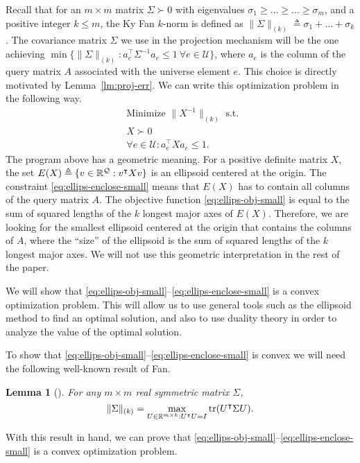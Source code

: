 \documentclass{article}
\newtheorem{lemma}{Lemma}[theorem]
\def\tr{{\rm tr}} \def\rank{{\rm rank}}
\newcommand{\univ}{U}
\newcommand{\tra}{\intercal}
\renewcommand{\univ}{\mathcal{U}}
\newcommand{\quer}{\mathcal{Q}}
\begin{document}
Recall that for an $m\times m$ matrix $\Sigma \succ 0$ with
eigenvalues $\sigma_1 \geq \ldots \geq \ldots \geq \sigma_m$, and a
positive integer $k \leq m$, the Ky Fan $k$-norm is defined as
$\|\Sigma\|_{(k)} \triangleq \sigma_1 + \ldots + \sigma_k$.  The
covariance matrix $\Sigma$ we use in the projection mechanism will be
the one achieving $\min\{\|\Sigma\|_{(k)}: a_e^\tra \Sigma^{-1}a_e \leq
1~\forall e\in \univ\}$, where $a_e$ is the column of the query matrix
$A$ associated with the universe element $e$. This choice is directly
motivated by Lemma~\ref{lm:proj-err}.  We can write this optimization
problem in the following way.
\begin{align}
  &\text{Minimize } \|X^{-1}\|_{(k)} \label{eq:ellips-obj-small}
  \text{ s.t. }\\
  &X\succ 0\\
  &\forall e \in \univ: a_e^\intercal Xa_e \leq 1.\label{eq:ellips-enclose-small}
\end{align}
The program above has a geometric meaning. For a positive definite
matrix $X$, the set $E(X)\triangleq\{v \in \R^\quer:
v^\tra X v\}$ is an ellipsoid centered at the origin. The constraint
\eqref{eq:ellips-enclose-small} means that $E(X)$ has to contain all
columns of the query matrix $A$. The objective function
\eqref{eq:ellips-obj-small} is equal to the sum of squared lengths of
the $k$ longest major axes of $E(X)$. Therefore, we are looking for
the smallest  ellipsoid centered at the origin that contains the
columns of $A$, where the ``size'' of the ellipsoid is the sum of
squared lengths of the $k$ longest major axes. We will not use this
geometric interpretation in the rest of the paper.

We will show that
\eqref{eq:ellips-obj-small}--\eqref{eq:ellips-enclose-small} is a
convex optimization problem. This will allow us to use general tools
such as the ellipsoid method to find an optimal solution, and also to
use duality theory in order to analyze the value of the optimal
solution.

To show that
\eqref{eq:ellips-obj-small}--\eqref{eq:ellips-enclose-small} is convex
we will need the following well-known result of Fan.

\begin{lemma}[\cite{Fan49}]\label{lm:kyfan}
  For any $m\times m$ real symmetric matrix $\Sigma$, 
  \[
  \|\Sigma\|_{(k)} = \max_{U \in \R^{m\times k}: U^\tra U = I} \tr(U^\tra \Sigma U).
  \]
\end{lemma}

With this result in hand, we can prove that
\eqref{eq:ellips-obj-small}--\eqref{eq:ellips-enclose-small} is a
convex optimization problem.
\end{document}
